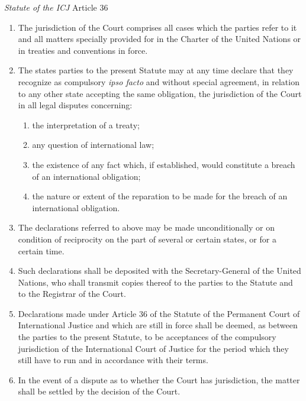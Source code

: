 \begin{statutedetails}{\textit{Statute of the ICJ} Article 36}
    \flushleft
    \begin{enumerate}
        \item The jurisdiction of the Court comprises all cases which the parties refer to it and all matters specially provided for in the Charter of the United Nations or in treaties and conventions in force.
        \item The states parties to the present Statute may at any time declare that they recognize as compulsory \textit{ipso facto} and without special agreement, in relation to any other state accepting the same obligation, the jurisdiction of the Court in all legal disputes concerning:
        \begin{enumerate}
            \item the interpretation of a treaty;
            \item any question of international law;
            \item the existence of any fact which, if established, would constitute a breach of an international obligation;
            \item the nature or extent of the reparation to be made for the breach of an international obligation.
        \end{enumerate}
        \item The declarations referred to above may be made unconditionally or on condition of reciprocity on the part of several or certain states, or for a certain time.
        \item Such declarations shall be deposited with the Secretary-General of the United Nations, who shall transmit copies thereof to the parties to the Statute and to the Registrar of the Court.
        \item Declarations made under Article 36 of the Statute of the Permanent Court of International Justice and which are still in force shall be deemed, as between the parties to the present Statute, to be acceptances of the compulsory jurisdiction of the International Court of Justice for the period which they still have to run and in accordance with their terms.
        \item In the event of a dispute as to whether the Court has jurisdiction, the matter shall be settled by the decision of the Court.
    \end{enumerate}
\end{statutedetails}


